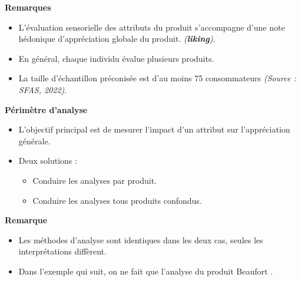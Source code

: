 \documentclass[aspectratio=169,xcolor=dvipsnames]{beamer}
\begin{document}
\begin{frame}
	\begin{exampleblock}{\textbf{Remarques}}
		\begin{itemize}
		\item L'évaluation sensorielle des attributs du produit s'accompagne d'une note hédonique d'appréciation globale du produit. \emph{(\textbf{liking})}.
		\item En général, chaque individu évalue plusieurs produits.
		\item La taille d'échantillon préconisée est d'au moins 75 consommateurs \emph{(Source : SFAS, 2022)}.
		\end{itemize}
	\end{exampleblock}
\end{frame}

\begin{frame}
	\begin{block}{\textbf{Périmètre d'analyse}}
		\begin{itemize}
		\item L'objectif principal est de mesurer l'impact d'un attribut sur l'appréciation générale.
		\item Deux solutions :
			\begin{itemize}
			\item Conduire les analyses par produit.
			\item Conduire les analyses tous produits confondus.
			\end{itemize}
		\end{itemize}
	\end{block}
	
	\begin{exampleblock}{\textbf{Remarque}}
		\begin{itemize}
		\item Les méthodes d'analyse sont identiques dans les deux cas, seules les interprétations diffèrent.
		\item Dans l'exemple qui suit, on ne fait que l'analyse du produit \og Beaufort \fg{}. 
		\end{itemize}

	\end{exampleblock}
\end{frame}
\end{document}
